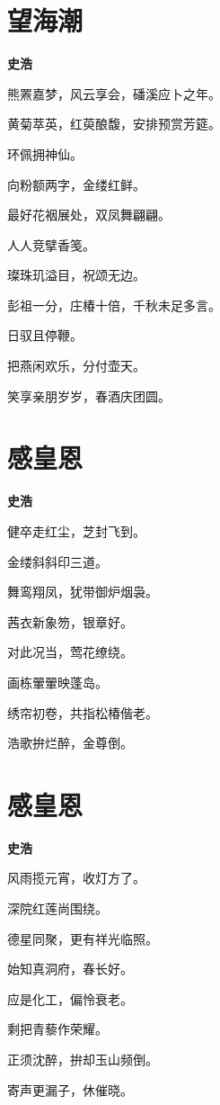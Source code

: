 \documentclass[12pt,a4paper]{ctexbook}
\begin{document}
\section{望海潮}
\textbf{史浩}\par\vspace{0.5em}
熊罴嘉梦，风云享会，磻溪应卜之年。\par
黄菊萃英，红萸酿馥，安排预赏芳筵。\par
环佩拥神仙。\par
向粉额两字，金缕红鲜。\par
最好花裀展处，双凤舞翩翩。\par
人人竞擘香笺。\par
璨珠玑溢目，祝颂无边。\par
彭祖一分，庄椿十倍，千秋未足多言。\par
日驭且停鞭。\par
把燕闲欢乐，分付壶天。\par
笑享亲朋岁岁，春酒庆团圆。\par

\section{感皇恩}
\textbf{史浩}\par\vspace{0.5em}
健卒走红尘，芝封飞到。\par
金缕斜斜印三道。\par
舞鸾翔凤，犹带御炉烟袅。\par
茜衣新象笏，银章好。\par
对此况当，莺花缭绕。\par
画栋翬翬映蓬岛。\par
绣帘初卷，共指松椿偕老。\par
浩歌拚烂醉，金尊倒。\par

\section{感皇恩}
\textbf{史浩}\par\vspace{0.5em}
风雨揽元宵，收灯方了。\par
深院红莲尚围绕。\par
德星同聚，更有祥光临照。\par
始知真洞府，春长好。\par
应是化工，偏怜衰老。\par
剩把青藜作荣耀。\par
正须沈醉，拚却玉山频倒。\par
寄声更漏子，休催晓。\par
\end{document}
